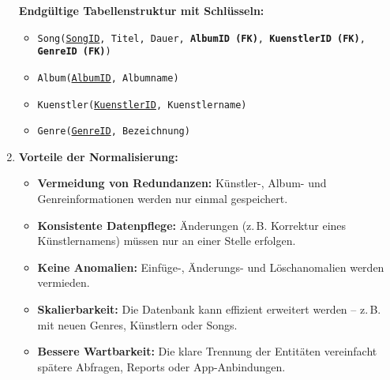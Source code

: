 \documentclass[a4paper,12pt]{article}
\begin{document}
\begin{enumerate}
		\vspace{1em}
		
		\textbf{Endgültige Tabellenstruktur mit Schlüsseln:}
		
		\begin{itemize}
			\item \texttt{Song(\underline{SongID}, Titel, Dauer, \textbf{AlbumID (FK)}, \textbf{KuenstlerID (FK)}, \textbf{GenreID (FK)})}
			\item \texttt{Album(\underline{AlbumID}, Albumname)}
			\item \texttt{Kuenstler(\underline{KuenstlerID}, Kuenstlername)}
			\item \texttt{Genre(\underline{GenreID}, Bezeichnung)}
		\end{itemize}
		
		\vspace{1em}
		
		\item \textbf{Vorteile der Normalisierung:}
		
		\begin{itemize}
			\item \textbf{Vermeidung von Redundanzen:} Künstler-, Album- und Genreinformationen werden nur einmal gespeichert.
			\item \textbf{Konsistente Datenpflege:} Änderungen (z.\,B. Korrektur eines Künstlernamens) müssen nur an einer Stelle erfolgen.
			\item \textbf{Keine Anomalien:} Einfüge-, Änderungs- und Löschanomalien werden vermieden.
			\item \textbf{Skalierbarkeit:} Die Datenbank kann effizient erweitert werden – z.\,B. mit neuen Genres, Künstlern oder Songs.
			\item \textbf{Bessere Wartbarkeit:} Die klare Trennung der Entitäten vereinfacht spätere Abfragen, Reports oder App-Anbindungen.
		\end{itemize}
		
	\end{enumerate}
	
	
\end{document}

